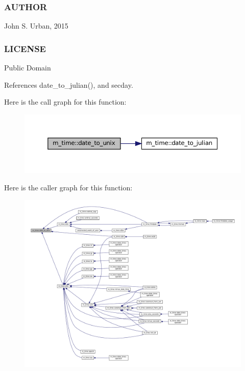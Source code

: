  \subsubsection*{A\+U\+T\+H\+OR}

John S. Urban, 2015 \subsubsection*{L\+I\+C\+E\+N\+SE}

Public Domain 

References date\+\_\+to\+\_\+julian(), and secday.

Here is the call graph for this function\+:\nopagebreak
\begin{figure}[H]
\begin{center}
\leavevmode
\includegraphics[width=350pt]{namespacem__time_aed245c691853279ebf0ce899dec9caa9_cgraph}
\end{center}
\end{figure}
Here is the caller graph for this function\+:\nopagebreak
\begin{figure}[H]
\begin{center}
\leavevmode
\includegraphics[width=350pt]{namespacem__time_aed245c691853279ebf0ce899dec9caa9_icgraph}
\end{center}
\end{figure}
\mbox{\label{namespacem__time_a99393c7906f1989f90ece03969224938}} 
